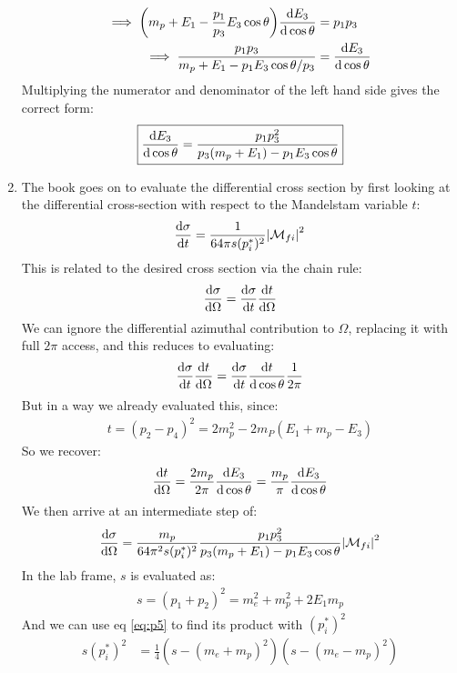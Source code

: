\documentclass[12pt]{article}
\newcommand{\M}{\mathcal{M}}
\begin{document}
\begin{enumerate}[label=\alph*)]
\begin{align*}
    \implies \qty(m_p+E_1-\frac{p_1}{p_3}E_3\cos\theta)\dv{E_3}{\cos\theta}
    &=p_1p_3\\
    \implies\frac{p_1p_3}{m_p+E_1-p_1E_3\cos\theta/p_3}&=\dv{E_3}{\cos\theta}
  \end{align*}
  Multiplying the numerator and denominator of the left hand side gives the correct form:
  \begin{equation}
    \label{eq:p6a}
    \boxed{\dv{E_3}{\cos\theta}=\frac{p_1p_3^2}{p_3(m_p+E_1)-p_1E_3\cos\theta}}
  \end{equation}
\item The book goes on to evaluate the differential cross section by first looking at the differential cross-section with respect to the Mandelstam variable $t$:
  \begin{align*}
    \dv{\sigma}{t}=\frac1{64\pi s(p_i^*)^2}\abs{\M_{fi}}^2
  \end{align*}
  This is related to the desired cross section via the chain rule:
  \begin{align*}
    \dv{\sigma}{\Omega}=\dv{\sigma}{t}\dv{t}{\Omega}
  \end{align*}
  We can ignore the differential azimuthal contribution to $\Omega$, replacing it with full $2\pi$ access, and this reduces to evaluating:
  \begin{align*}
    \dv{\sigma}{t}\dv{t}{\Omega}=\dv{\sigma}{t}\dv{t}{\cos\theta}\frac1{2\pi}
  \end{align*}
  But in a way we already evaluated this, since:
  \begin{align*}
    t=(p_2-p_4)^2=2m_p^2-2m_P(E_1+m_p-E_3)
  \end{align*}
  So we recover:
  \begin{align*}
    \dv{t}{\Omega}=\frac{2m_p}{2\pi}\dv{E_3}{\cos\theta}=
    \frac{m_p}\pi\dv{E_3}{\cos\theta}
  \end{align*}
  We then arrive at an intermediate step of:
  \begin{align*}
    \dv{\sigma}{\Omega}=\frac{m_p}{64\pi^2s(p_i^*)^2}
    \frac{p_1p_3^2}{p_3(m_p+E_1)-p_1E_3\cos\theta}\abs{\M_{fi}}^2
  \end{align*}
  In the lab frame, $s$ is evaluated as:
  \begin{align*}
    s=(p_1+p_2)^2=m_e^2+m_p^2+2E_1m_p
  \end{align*}
  And we can use eq \eqref{eq:p5} to find its product with $(p_i^*)^2$
  \begin{align*}
    s(p_i^*)^2&=\frac14(s-(m_e+m_p)^2)(s-(m_e-m_p)^2)\\

\end{align*}
\end{enumerate}
\end{document}
